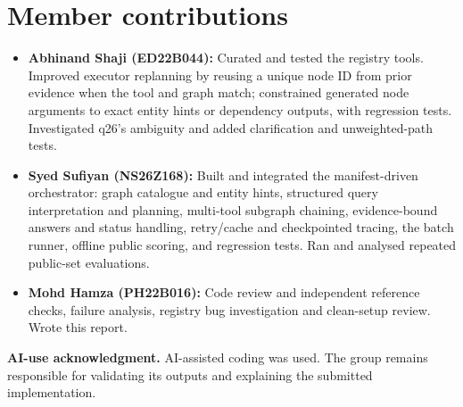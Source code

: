 \documentclass[10pt,a4paper]{article}
\begin{document}
\section{Member contributions}
\begin{itemize}
\item \textbf{Abhinand Shaji (ED22B044):} Curated and tested the registry tools. Improved executor
  replanning by reusing a unique node ID from prior evidence when the tool and graph match; constrained
  generated node arguments to exact entity hints or dependency outputs, with regression tests. Investigated
  q26's ambiguity and added clarification and unweighted-path tests.
\item \textbf{Syed Sufiyan (NS26Z168):} Built and integrated the manifest-driven orchestrator: graph
  catalogue and entity hints, structured query interpretation and planning, multi-tool subgraph chaining,
  evidence-bound answers and status handling, retry/cache and checkpointed tracing, the batch runner,
  offline public scoring, and regression tests. Ran and analysed repeated public-set evaluations.
\item \textbf{Mohd Hamza (PH22B016):} Code review and independent reference checks, failure analysis,
  registry bug investigation and clean-setup review. Wrote this report.
\end{itemize}

\textbf{AI-use acknowledgment.} AI-assisted coding was used. The group remains responsible for
validating its outputs and explaining the submitted implementation.
\end{document}
